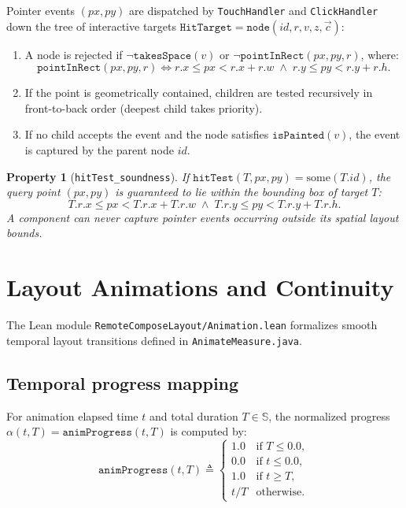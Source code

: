 \documentclass[11pt,a4paper]{article}
\newcommand{\Sc}{\mathbb{S}}
\newcommand{\lo}[1]{\texttt{#1}}       %
\newcommand{\jv}[1]{\texttt{#1}}       %
\newcommand{\file}[1]{\texttt{#1}}
\theoremstyle{definition}
\theoremstyle{plain}
\newtheorem{property}{Property}[section]
\theoremstyle{remark}
\begin{document}
Pointer events $(px, py)$ are dispatched by \jv{TouchHandler} and \jv{ClickHandler}
down the tree of interactive targets $\lo{HitTarget} = \lo{node}(id, r, v, z, \vec{c})$:
\begin{enumerate}
  \item A node is rejected if $\neg\lo{takesSpace}(v)$ or $\neg\lo{pointInRect}(px, py, r)$, where:
    \[
      \lo{pointInRect}(px, py, r) \iff r.x \le px < r.x + r.w \;\land\; r.y \le py < r.y + r.h.
    \]
  \item If the point is geometrically contained, children are tested recursively
    in front-to-back order (deepest child takes priority).
  \item If no child accepts the event and the node satisfies $\lo{isPainted}(v)$,
    the event is captured by the parent node $id$.
\end{enumerate}

\begin{property}[\lo{hitTest\_soundness}]
If $\lo{hitTest}(T, px, py) = \mathrm{some}(T.id)$, the query point $(px, py)$
is guaranteed to lie within the bounding box of target $T$:
\[
  T.r.x \le px < T.r.x + T.r.w \;\land\; T.r.y \le py < T.r.y + T.r.h.
\]
A component can never capture pointer events occurring outside its spatial layout bounds.
\end{property}

\section{Layout Animations and Continuity}
\label{sec:animation}

The Lean module \file{RemoteComposeLayout/Animation.lean} formalizes smooth
temporal layout transitions defined in \jv{AnimateMeasure.java}.

\subsection{Temporal progress mapping}
\label{sec:anim-progress}

For animation elapsed time $t$ and total duration $T \in \Sc$, the normalized
progress $\alpha(t, T) = \lo{animProgress}(t, T)$ is computed by:
\[
  \lo{animProgress}(t, T) \triangleq \begin{cases}
    1.0   & \text{if } T \le 0.0, \\
    0.0   & \text{if } t \le 0.0, \\
    1.0   & \text{if } t \ge T, \\
    t / T & \text{otherwise.}
  \end{cases}
\]
\end{document}
